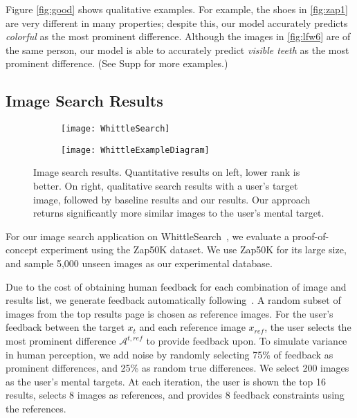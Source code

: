 \documentclass[10pt,twocolumn,letterpaper]{article}
\begin{document}
Figure \ref{fig:good} shows qualitative examples. For example, the shoes in \ref{fig:zap1} are very different in many properties; despite this, our model accurately predicts \textit{colorful} as the most prominent difference. Although the images in \ref{fig:lfw6} are of the same person, our model is able to accurately predict \textit{visible teeth} as the most prominent difference. (See Supp for more examples.)


\subsection{Image Search Results} \label{imagesearchresults}

\begin{figure}[t]
    \centering
    \begin{subfigure}[c]{0.49\linewidth}
        \centering
        \texttt{[image: WhittleSearch]}
        \label{fig:whittlegraph}
    \end{subfigure}
    \hfill
    \begin{subfigure}[c]{0.49\linewidth}
        \centering
        \texttt{[image: WhittleExampleDiagram]}
        \label{fig:whittleexample}
    \end{subfigure}
    
    \vspace{-0.3cm}
    
    \caption[Image Search Results]{Image search results. Quantitative results on left, lower rank is better. On right, qualitative search results with a user's target image, followed by baseline results and our results. Our approach returns significantly more similar images to the user's mental target.}
    \label{fig:whittlesearchresults}
\end{figure}

For our image search application on WhittleSearch~\cite{whittlesearch, whittlesearch2}, we evaluate a proof-of-concept experiment using the Zap50K dataset. We use Zap50K for its large size, and sample 5,000 unseen images as our experimental database.

Due to the cost of obtaining human feedback for each combination of image and results list, we generate feedback automatically following~\cite{whittlesearch}. A random subset of images from the top results page is chosen as reference images. For the user's feedback between the target $x_t$ and each reference image $x_{ref}$, the user selects the most prominent difference $\mathcal{A}^{t,ref}$ to provide feedback upon. To simulate variance in human perception, we add noise by randomly selecting 75\% of feedback as prominent differences, and 25\% as random true differences. We select 200 images as the user's mental targets. At each iteration, the user is shown the top 16 results, selects 8 images as references, and provides 8 feedback constraints using the references.
\end{document}
